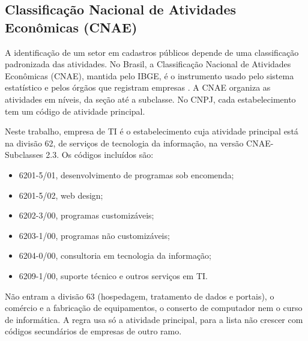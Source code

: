 \subsection{Classificação Nacional de Atividades Econômicas (CNAE)}

A identificação de um setor em cadastros públicos depende de uma classificação padronizada das atividades.
No Brasil, a Classificação Nacional de Atividades Econômicas (CNAE), mantida pelo IBGE, é o instrumento usado pelo sistema estatístico e pelos órgãos que registram empresas \cite{ibge2020}.
A CNAE organiza as atividades em níveis, da seção até a subclasse.
No CNPJ, cada estabelecimento tem um código de atividade principal.

Neste trabalho, empresa de TI é o estabelecimento cuja atividade principal está na divisão 62, de serviços de tecnologia da informação, na versão CNAE-Subclasses 2.3.
Os códigos incluídos são:
\begin{itemize}
    \item 6201-5/01, desenvolvimento de programas sob encomenda;
    \item 6201-5/02, web design;
    \item 6202-3/00, programas customizáveis;
    \item 6203-1/00, programas não customizáveis;
    \item 6204-0/00, consultoria em tecnologia da informação;
    \item 6209-1/00, suporte técnico e outros serviços em TI.
\end{itemize}
Não entram a divisão 63 (hospedagem, tratamento de dados e portais), o comércio e a fabricação de equipamentos, o conserto de computador nem o curso de informática.
A regra usa só a atividade principal, para a lista não crescer com códigos secundários de empresas de outro ramo.
